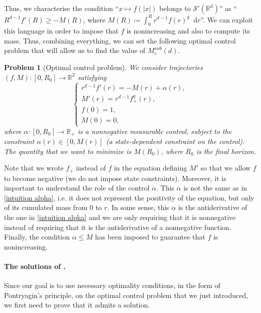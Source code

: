 \documentclass[11pt,a4paper]{article}
\numberwithin{equation}{section}
\newcommand{\R}{{\mathbb{R}}}
\theoremstyle{plain}
\newtheorem{problem}[theorem]{Problem}
\theoremstyle{remark}
\newcommand{\diff}{\mathop{}\!\mathrm{d}}
\begin{document}
Thus, we  characterise the condition  ``$x\mapsto f(|x|)$ belongs to $\mathcal{S'}(\R^d)$'' as ``$R^{d-1}f'(R)\geq -M(R)$, where $M(R)\coloneqq\int_0^R r^{d-1}f(r)^q\diff r$''. We can exploit this language in order to impose that $f$ is nonincreasing and also to compute its mass. Thus, combining everything, we can set the following optimal control problem that will allow us to find the value of $M_c^{sub} (d)$.
\begin{problem}[Optimal control problem]
We consider trajectories $(f,M):[0,R_0]\to \R^2$ satisfying
\begin{equation}\label{eq:Pontryagin}
\begin{cases} r^{d-1}f'(r)=-M(r)+\alpha(r),\\
			M'(r)=r^{d-1}f_+^q(r),\\
			f(0)=1,\\
			M(0)=0,\end{cases}
\end{equation}
where $\alpha:[0,R_0]\to \R_+$ is a nonnegative measurable control, subject to the constraint $\alpha(r)\in [0,M(r)]$ (a state-dependent constraint on the control). The quantity that we want to minimize is $M(R_0)$, where $R_0$ is the final horizon.
\end{problem}

Note that we wrote $f_+$ instead of $f$ in the equation defining $M'$ so that we allow $f$ to become negative (we do not impose state constraints). Moreover, it is important to understand the role of the control $\alpha$. This $\alpha$ is not the same as in \eqref{intuition alpha}, i.e. it does not represent the positivity of the equation, but only of its cumulated mass from $0$ to $r$. In some sense, this $\alpha$ is the antiderivative of the one in \eqref{intuition alpha} and we are only requiring that it is nonnegative instead of requiring that it is the antiderivative of a nonnegative function. Finally, the condition $\alpha\leq M$ has been imposed to guarantee that $f$ is nonincreasing. 
\label{prob:OC}



\paragraph{The solutions of .}

Since our goal is to use necessary optimality conditions, in the form of Pontryagin's principle, on the optimal control problem that we just introduced, we first need to prove that it admits a solution.
\end{document}
